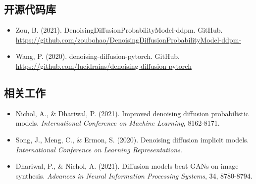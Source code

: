 \documentclass{ctexart}
\begin{document}
\subsection{开源代码库}
\begin{itemize}
    \item Zou, B. (2021). DenoisingDiffusionProbabilityModel-ddpm. GitHub. \\
    \url{https://github.com/zoubohao/DenoisingDiffusionProbabilityModel-ddpm-}
    
    \item Wang, P. (2020). denoising-diffusion-pytorch. GitHub. \\
    \url{https://github.com/lucidrains/denoising-diffusion-pytorch}
\end{itemize}

\subsection{相关工作}
\begin{itemize}
    \item Nichol, A., \& Dhariwal, P. (2021). Improved denoising diffusion probabilistic models. \textit{International Conference on Machine Learning}, 8162-8171.
    
    \item Song, J., Meng, C., \& Ermon, S. (2020). Denoising diffusion implicit models. \textit{International Conference on Learning Representations}.
    
    \item Dhariwal, P., \& Nichol, A. (2021). Diffusion models beat GANs on image synthesis. \textit{Advances in Neural Information Processing Systems}, 34, 8780-8794.
\end{itemize}
 
    
\end{document}
